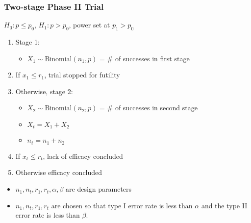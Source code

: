 \documentclass{beamer}\usepackage[]{graphicx}\usepackage[]{color}
\begin{document}
\begin{frame}
\frametitle{Two-stage Phase II Trial}
 $H_0: p \leq p_0$, $H_1: p > p_0$, power set at $p_1 > p_0$ %
    \begin{enumerate} %
        \item Stage 1:
          \begin{itemize}
            \item $X_1 \sim \mbox{Binomial}(n_1,p)$ = \# of successes in first stage
          \end{itemize}
        \item If $x_1 \leq r_1$, trial stopped for futility
        \item Otherwise, stage 2:  
          \begin{itemize}
            \item $X_2 \sim \mbox{Binomial}(n_2,p)$ = \# of successes in second stage
            \item $X_t = X_1 + X_2$
            \item $n_t = n_1 + n_2$
          \end{itemize}
        \item If $x_t \leq r_t$, lack of efficacy concluded
        \item Otherwise efficacy concluded
    \end{enumerate}
    \begin{itemize}
      \item $n_1, n_t, r_1, r_t, \alpha,\beta$ are design parameters
      \item $n_1, n_t, r_1, r_t$ are chosen so that type I error rate is less than $\alpha$ and the type II error rate is less than $\beta$.
    \end{itemize}
\end{frame}

\end{document}
